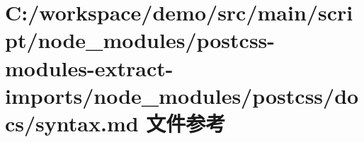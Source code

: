 \hypertarget{postcss-modules-extract-imports_2node__modules_2postcss_2docs_2syntax_8md}{}\section{C\+:/workspace/demo/src/main/script/node\+\_\+modules/postcss-\/modules-\/extract-\/imports/node\+\_\+modules/postcss/docs/syntax.md 文件参考}
\label{postcss-modules-extract-imports_2node__modules_2postcss_2docs_2syntax_8md}
